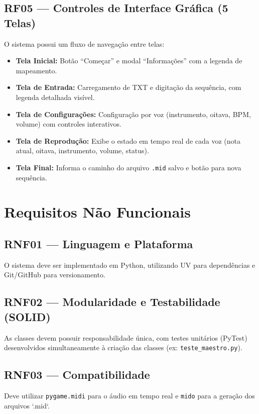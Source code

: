 \documentclass[12pt, a4paper]{article}
\begin{document}
\subsection{RF05 — Controles de Interface Gráfica (5 Telas)}

O sistema possui um fluxo de navegação entre telas:
\begin{itemize}[leftmargin=2cm]
  \item \textbf{Tela Inicial:} Botão ``Começar'' e modal ``Informações'' com a legenda de mapeamento.
  \item \textbf{Tela de Entrada:} Carregamento de TXT e digitação da sequência, com legenda detalhada visível.
  \item \textbf{Tela de Configurações:} Configuração por voz (instrumento, oitava, BPM, volume) com controles interativos.
  \item \textbf{Tela de Reprodução:} Exibe o estado em tempo real de cada voz (nota atual, oitava, instrumento, volume, status).
  \item \textbf{Tela Final:} Informa o caminho do arquivo \texttt{.mid} salvo e botão para nova sequência.
\end{itemize}


\section{Requisitos Não Funcionais}

\subsection{RNF01 — Linguagem e Plataforma}
O sistema deve ser implementado em Python, utilizando UV para dependências e Git/GitHub para versionamento.

\subsection{RNF02 — Modularidade e Testabilidade (SOLID)}
As classes devem possuir responsabilidade única, com testes unitários (PyTest) desenvolvidos simultaneamente à criação das classes (ex: \texttt{teste\_maestro.py}).

\subsection{RNF03 — Compatibilidade}
Deve utilizar \texttt{pygame.midi} para o áudio em tempo real e \texttt{mido} para a geração dos arquivos `.mid`.
\end{document}
